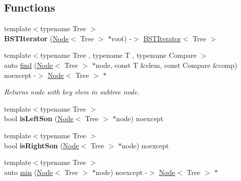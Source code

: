 \subsection*{Functions}
\begin{DoxyCompactItemize}
\item 
\mbox{\label{namespacelab_1_1forest_1_1detail_ad6c94d5f86fe169609f866b00bb12ca4}} 
{\footnotesize template$<$typename Tree $>$ }\\{\bfseries B\+S\+T\+Iterator} (\hyperlink{structlab_1_1forest_1_1detail_1_1Node}{Node}$<$ Tree $>$ $\ast$root) -\/$>$ \hyperlink{classlab_1_1forest_1_1detail_1_1BSTIterator}{B\+S\+T\+Iterator}$<$ Tree $>$
\item 
\mbox{\label{namespacelab_1_1forest_1_1detail_afb98b9a3926409e631bb25e421435948}} 
{\footnotesize template$<$typename Tree , typename T , typename Compare $>$ }\\auto \hyperlink{namespacelab_1_1forest_1_1detail_afb98b9a3926409e631bb25e421435948}{find} (\hyperlink{structlab_1_1forest_1_1detail_1_1Node}{Node}$<$ Tree $>$ $\ast$node, const T \&elem, const Compare \&comp) noexcept -\/$>$ \hyperlink{structlab_1_1forest_1_1detail_1_1Node}{Node}$<$ Tree $>$ $\ast$
\begin{DoxyCompactList}\small\item\em Returns node with key elem in subtree node. \end{DoxyCompactList}\item 
\mbox{\label{namespacelab_1_1forest_1_1detail_a8232fa106684cfa32c642cdc74588020}} 
{\footnotesize template$<$typename Tree $>$ }\\bool {\bfseries is\+Left\+Son} (\hyperlink{structlab_1_1forest_1_1detail_1_1Node}{Node}$<$ Tree $>$ $\ast$node) noexcept
\item 
\mbox{\label{namespacelab_1_1forest_1_1detail_a4d272afcedeaeab259efea52775a1e64}} 
{\footnotesize template$<$typename Tree $>$ }\\bool {\bfseries is\+Right\+Son} (\hyperlink{structlab_1_1forest_1_1detail_1_1Node}{Node}$<$ Tree $>$ $\ast$node) noexcept
\item 
{\footnotesize template$<$typename Tree $>$ }\\auto \hyperlink{namespacelab_1_1forest_1_1detail_a56c6d104e669b3ae029cf7ddbd79e72f}{min} (\hyperlink{structlab_1_1forest_1_1detail_1_1Node}{Node}$<$ Tree $>$ $\ast$node) noexcept -\/$>$ \hyperlink{structlab_1_1forest_1_1detail_1_1Node}{Node}$<$ Tree $>$ $\ast$

\end{DoxyCompactItemize}
